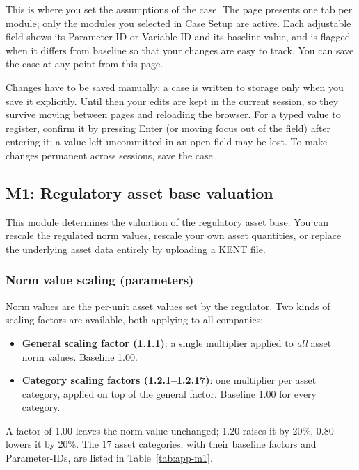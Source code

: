 This is where you set the assumptions of the case. The page presents one tab per module; only the modules you selected in Case Setup are active. Each adjustable field shows its Parameter-ID or Variable-ID and its baseline value, and is flagged when it differs from baseline so that your changes are easy to track. You can save the case at any point from this page.

Changes have to be saved manually: a case is written to storage only when you save it explicitly. Until then your edits are kept in the current session, so they survive moving between pages and reloading the browser. For a typed value to register, confirm it by pressing Enter (or moving focus out of the field) after entering it; a value left uncommitted in an open field may be lost. To make changes permanent across sessions, save the case.

\subsection{M1: Regulatory asset base valuation}
\label{sec:spec-m1}

This module determines the valuation of the regulatory asset base. You can rescale the regulated norm values, rescale your own asset quantities, or replace the underlying asset data entirely by uploading a KENT file.

\subsubsection{Norm value scaling (parameters)}
Norm values are the per-unit asset values set by the regulator. Two kinds of scaling factors are available, both applying to all companies:

\begin{itemize}
  \item \textbf{General scaling factor (1.1.1)}: a single multiplier applied to \emph{all} asset norm values. Baseline 1.00.
  \item \textbf{Category scaling factors (1.2.1--1.2.17)}: one multiplier per asset category, applied on top of the general factor. Baseline 1.00 for every category.
\end{itemize}

\noindent A factor of 1.00 leaves the norm value unchanged; 1.20 raises it by 20\%, 0.80 lowers it by 20\%. The 17 asset categories, with their baseline factors and Parameter-IDs, are listed in Table~\ref{tab:app-m1}.

